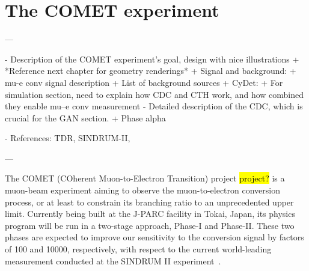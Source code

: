 \chapter{The COMET experiment}\label{chapter2}

\begin{markdown}
---

- Description of the COMET experiment's goal, design with nice illustrations
    + *Reference next chapter for geometry renderings*
    + Signal and background:
        + mu-e conv signal description
        + List of background sources
+ CyDet:
    + For simulation section, need to explain how CDC and CTH work, and how combined they enable mu--e conv measurement
    - Detailed description of the CDC, which is crucial for the GAN section.
+ Phase alpha

- References: TDR, SINDRUM-II, 

---
\end{markdown}

The COMET (COherent Muon-to-Electron Transition) project \hl{project?} is a muon-beam experiment aiming to observe the muon-to-electron conversion process, or at least to constrain its branching ratio to an unprecedented upper limit.
Currently being built at the J-PARC facility in Tokai, Japan, its physics program will be run in a two-stage approach, Phase-I and Phase-II. These two phases are expected to improve our sensitivity to the conversion signal by factors of 100 and \num{10000}, respectively, with respect to the current world-leading measurement conducted at the SINDRUM II experiment~\cite{Bertl:2006up}.



